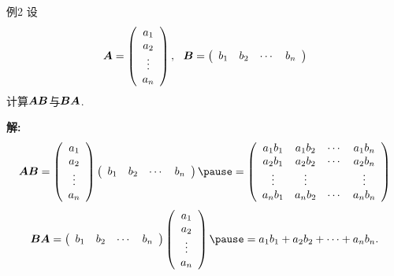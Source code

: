 \begin{frame}
  \begin{footnotesize}
    \begin{exampleblock}{例2}
      设
      $$
      \boldsymbol{A} = \left(
        \begin{array}{c}
          a_1\\
          a_2\\
          \vdots\\
          a_n
        \end{array}
      \right), ~~
      \boldsymbol{B} = \left(
        \begin{array}{cccc}
          b_1 & b_2 & \cdots & b_n
        \end{array}
      \right)
      $$
      计算$\boldsymbol{A}\boldsymbol{B}$与$\boldsymbol{B}\boldsymbol{A}$.
    \end{exampleblock}
    \textbf{解:}
    $$
    \A\B = \left(
      \begin{array}{c}
        a_1\\
        a_2\\
        \vd\\
        a_n
      \end{array}
    \right)\left(
      \begin{array}{cccc}
        b_1 & b_2 & \cd & b_n
      \end{array}
    \right)\pause 
    = \left(
      \begin{array}{cccc}
        a_1b_1 & a_1b_2 & \cd & a_1b_n\\
        a_2b_1 & a_2b_2 & \cd & a_2b_n\\
        \vd & \vd & & \vd\\
        a_nb_1 & a_nb_2 & \cd & a_nb_n
      \end{array}
    \right)
    $$ \pause 
    $$
    \B\A = \left(
      \begin{array}{cccc}
        b_1 & b_2 & \cd & b_n
      \end{array}
    \right)\left(
      \begin{array}{c}
        a_1\\
        a_2\\
        \vd\\
        a_n
      \end{array}
    \right) \pause 
    = a_1b_1+a_2b_2+\cd+a_nb_n.
    $$
  \end{footnotesize}
\end{frame}

